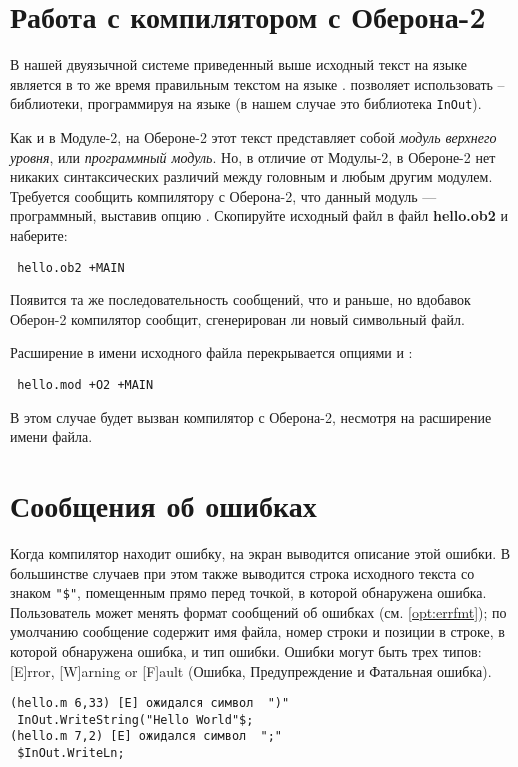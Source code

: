 \section{Работа с компилятором с Оберона-2}

В нашей двуязычной системе приведенный выше
исходный текст на языке \mt{} является в то же время правильным текстом
на языке \ot{}. \xds{} позволяет использовать 
\mt{} -- библиотеки, программируя на языке \ot{} (в нашем случае
это библиотека {\tt InOut}).

Как и в Модуле-2, на Обероне-2 этот текст представляет собой
{\em модуль верхнего уровня}, или {\em программный модуль}.
Но, в отличие от Модулы-2, в Обероне-2 нет никаких синтаксических различий
между головным и любым другим модулем. 
Требуется сообщить компилятору с Оберона-2, что данный модуль
--- программный, выставив опцию .
Скопируйте исходный файл в файл {\bf hello.ob2} и наберите:
\begin{flushleft} \tt
        \XC{} hello.ob2 +MAIN
\end{flushleft}
Появится та же последовательность сообщений, что и раньше, но
вдобавок Оберон-2 компилятор сообщит, сгенерирован ли новый 
символьный файл.

Расширение в имени исходного файла перекрывается опциями
 и :
\begin{flushleft} \tt
        \XC{} hello.mod +O2 +MAIN
\end{flushleft}
В этом случае будет вызван компилятор с Оберона-2, несмотря на
расширение имени файла.

\section{Сообщения об ошибках}

Когда компилятор находит ошибку, на экран выводится описание 
этой ошибки. В большинстве случаев при этом также выводится строка
исходного текста со знаком \verb|"$"|, помещенным прямо перед точкой, 
в которой обнаружена ошибка.
Пользователь может менять формат сообщений \xds{} об ошибках
(см. \ref{opt:errfmt}); по умолчанию сообщение содержит
имя файла, номер строки и позиции в строке, в которой обнаружена
ошибка, и тип ошибки.
Ошибки могут быть трех типов: [E]rror, [W]arning or [F]ault
(Ошибка, Предупреждение и Фатальная ошибка).

\Example
\begin{verbatim}
(hello.m 6,33) [E] ожидался символ  ")"
 InOut.WriteString("Hello World"$;
(hello.m 7,2) [E] ожидался символ  ";"
 $InOut.WriteLn;
\end{verbatim}

